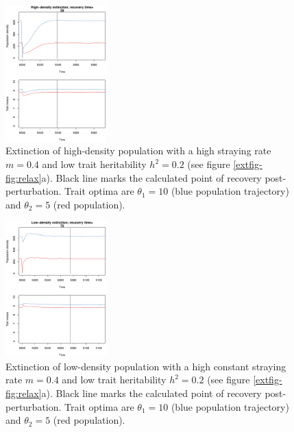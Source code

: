 \documentclass{revtex4}
\begin{document}
\begin{figure}
  \captionsetup{justification=raggedright,
singlelinecheck=false
}
\centering
\includegraphics[width=0.35\textwidth]{fig_relax_large.pdf}
\caption{
Extinction of high-density population with a high straying rate $m=0.4$ and low trait heritability $h^2=0.2$ (see figure \ref{extfig-fig:relax}a).
Black line marks the calculated point of recovery post-perturbation.
Trait optima are $\theta_1 = 10$ (blue population trajectory) and $\theta_2 = 5$ (red population).
} \label{fig:relaxtraj_hdlh}
\end{figure}


\begin{figure}
  \captionsetup{justification=raggedright,
singlelinecheck=false
}
\centering
\includegraphics[width=0.35\textwidth]{fig_relax_small.pdf}
\caption{
Extinction of low-density population with a high constant straying rate $m=0.4$ and low trait heritability $h^2=0.2$ (see figure \ref{extfig-fig:relax}a).
Black line marks the calculated point of recovery post-perturbation.
Trait optima are $\theta_1 = 10$ (blue population trajectory) and $\theta_2 = 5$ (red population).
} \label{fig:relaxtraj_ldlh}
\end{figure}
\end{document}
